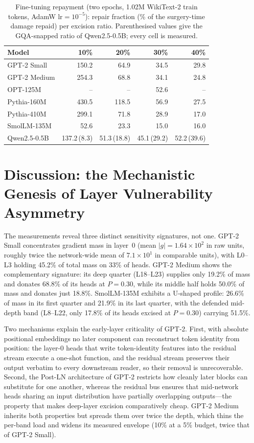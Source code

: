\documentclass[10pt,journal,compsoc]{IEEEtran}
\begin{document}
\begin{table}[!t]
\caption{Fine-tuning repayment (two epochs, 1.02M WikiText-2 train tokens,
AdamW $\mathrm{lr}{=}10^{-5}$): repair fraction (\% of the surgery-time damage
repaid) per excision ratio. Parenthesised values give the GQA-snapped ratio of
Qwen2.5-0.5B; every cell is measured.}
\label{tab:repay}
\centering
\scriptsize
\setlength{\tabcolsep}{3.2pt}
\begin{tabular}{lrrrr}
\toprule
Model & 10\% & 20\% & 30\% & 40\% \\
\midrule
GPT-2 Small & 150.2 & 64.9 & 34.5 & 29.8 \\
GPT-2 Medium & 254.3 & 68.8 & 34.1 & 24.8 \\
OPT-125M & -- & -- & 52.6 & -- \\
Pythia-160M & 430.5 & 118.5 & 56.9 & 27.5 \\
Pythia-410M & 299.1 & 71.8 & 28.9 & 17.0 \\
SmolLM-135M & 52.6 & 23.3 & 15.0 & 16.0 \\
Qwen2.5-0.5B & 137.2\,(8.3) & 51.3\,(18.8) & 45.1\,(29.2) & 52.2\,(39.6) \\
\bottomrule
\end{tabular}
\end{table}

\section{Discussion: the Mechanistic Genesis of Layer Vulnerability Asymmetry}

The measurements reveal three distinct sensitivity signatures, not one.
GPT-2 Small concentrates gradient mass in layer~0 (mean $|g| = 1.64\times10^{2}$ in
raw units, roughly twice the network-wide mean of $7.1\times10^{1}$ in comparable
units), with L0--L3 holding 45.2\% of total mass on 33\% of heads. GPT-2 Medium
shows the complementary signature: its deep quarter (L18--L23) supplies only
19.2\% of mass and donates 68.8\% of its heads at $P{=}0.30$, while its middle half
holds 50.0\% of mass and donates just 18.8\%. SmolLM-135M exhibits a U-shaped
profile: 26.6\% of mass in its first quarter and 21.9\% in its last quarter, with
the defended mid-depth band (L8--L22, only 17.8\% of its heads excised at
$P{=}0.30$) carrying 51.5\%.

Two mechanisms explain the early-layer criticality of GPT-2. First, with absolute
positional embeddings no later component can reconstruct token identity from
position: the layer-0 heads that write token-identity features into the residual
stream execute a one-shot function, and the residual stream preserves their
output verbatim to every downstream reader, so their removal is unrecoverable.
Second, the Post-LN architecture of GPT-2 restricts how cleanly later blocks can
substitute for one another, whereas the residual bus ensures that
mid-network heads sharing an input distribution have partially overlapping
outputs---the property that makes deep-layer excision comparatively cheap.
GPT-2 Medium inherits both properties but spreads them over twice the depth,
which thins the per-band load and widens its measured envelope (10\% at a 5\%
budget, twice that of GPT-2 Small).
\end{document}
